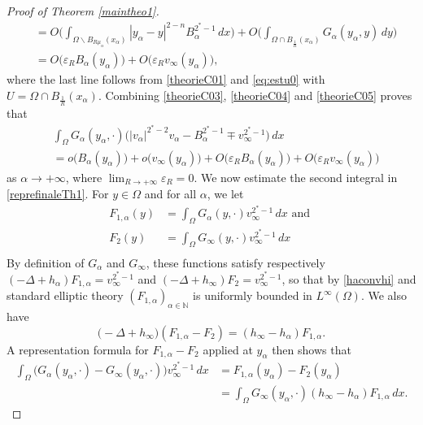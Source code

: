 \documentclass[10pt]{amsart}
\numberwithin{equation}{section}
\newcommand{\ve}{\varepsilon}
\newcommand{\Om}{\Omega}
\newcommand{\ma}{\mu_\alpha}
\def \ma{\mu_{\alpha}}
\def \nn{\mathbb{N}}
\theoremstyle{plain}
\theoremstyle{remark}
\begin{document}
\begin{proof}[Proof of Theorem \ref{maintheo1}]
\begin{equation}
\begin{aligned}
&  = O \Big( \int_{\Om \backslash B_{R \ma}(x_\alpha)} |y_\alpha-y|^{2-n} B_\alpha^{2^*-1} \, dx \Big) + O \Big( \int_{\Om \cap B_{\frac{1}{R}}(x_\alpha)}G_\alpha(y_\alpha, y) \, dy \Big) \\
& = O \big(\ve_R B_\alpha(y_\alpha) \Big)+ O\big( \ve_R v_\infty(y_\alpha) \big),
\end{aligned} \end{equation}
where the last line follows from \eqref{theorieC01} and  \eqref{eq:estu0} with $U = \Om \cap B_{\frac{1}{R}}(x_\alpha)$. Combining \eqref{theorieC03}, \eqref{theorieC04} and \eqref{theorieC05} proves that 
\begin{equation} \label{theorieC06}
 \begin{aligned}
& \int_{\Om} G_\alpha(y_\alpha, \cdot)\Big( |v_\alpha|^{2^*-2} v_\alpha - B_\alpha^{2^*-1} \mp v_\infty^{2^*-1} \Big)\, dx  \\
& = o \big(B_\alpha(y_\alpha) \big)+ o\big( v_\infty(y_\alpha) \big) + O \big(\ve_R B_\alpha(y_\alpha) \Big)+ O\big( \ve_R v_\infty(y_\alpha) \big)
\end{aligned} \end{equation}
as $\alpha \to + \infty$, where $\lim_{R \to + \infty} \ve_R = 0$. We now estimate the second integral in \eqref{reprefinaleTh1}. For $y \in \Om$ and for all $\alpha$, we let 
$$\begin{aligned}
 F_{1,\alpha}(y) & = \int_{\Om} G_\alpha(y, \cdot)  v_\infty^{2^*-1}  \, dx \text{ and } \\
 F_{2}(y) & = \int_{\Om}  G_\infty(y, \cdot) v_\infty^{2^*-1}  \, dx \\
 \end{aligned} $$
By definition of $G_\alpha$ and $G_\infty$, these functions satisfy respectively $(-\Delta + h_\alpha)F_{1,\alpha} = v_\infty^{2^*-1}$ and $(-\Delta + h_\infty)F_{2} = v_\infty^{2^*-1}$, so that by \eqref{haconvhi} and standard elliptic theory $(F_{1,\alpha})_{\alpha \in \nn}$ is uniformly bounded in $L^\infty(\Om)$. We also have 
$$ \big( - \Delta + h_\infty \big)(F_{1,\alpha} - F_2) = (h_\infty - h_\alpha) F_{1,\alpha}. $$
A representation formula for $F_{1,\alpha} - F_2$ applied at $y_\alpha$ then shows that 
$$ \begin{aligned}
 \int_{\Om} \Big( G_\alpha(y_\alpha, \cdot) - G_\infty(y_\alpha, \cdot) \Big)  v_\infty^{2^*-1}  \, dx & = F_{1,\alpha}(y_\alpha) - F_2(y_\alpha) \\
& = \int_{\Om} G_\infty(y_\alpha, \cdot)  (h_\infty - h_\alpha) F_{1,\alpha} \, dx.
\end{aligned} $$

\end{proof}
\end{document}
